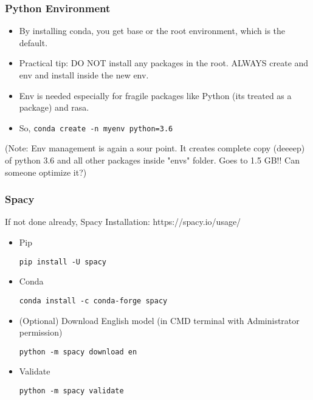  \begin{frame}[fragile]\frametitle{Python Environment}
\begin{itemize}
\item By installing conda, you get base or the root environment, which is the default.
\item Practical tip: DO NOT install any packages in the root. ALWAYS create and env and install inside the new env.
\item Env is needed especially for fragile packages like Python (its treated as a package) and rasa.
\item So, \lstinline|conda create -n myenv python=3.6| 
\end{itemize}

(Note: Env management is again a sour point. It creates complete copy (deeeep) of python 3.6 and all other packages inside "envs" folder. Goes to 1.5 GB!! Can someone optimize it?)
\end{frame}



 \begin{frame}[fragile]\frametitle{Spacy}
If not done already, Spacy Installation: https://spacy.io/usage/
\begin{itemize}
\item Pip
\begin{lstlisting}
pip install -U spacy
\end{lstlisting}
\item Conda
\begin{lstlisting}
conda install -c conda-forge spacy
\end{lstlisting}
\item (Optional) Download English model (in CMD terminal with Administrator permission)
\begin{lstlisting}
python -m spacy download en
\end{lstlisting}
\item Validate
\begin{lstlisting}
python -m spacy validate
\end{lstlisting}
\end{itemize}
\end{frame}



